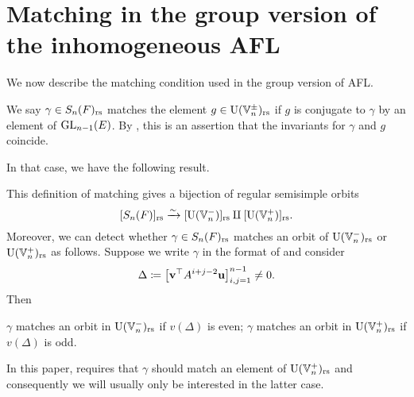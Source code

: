 \section{Matching in the group version of the inhomogeneous AFL}
We now describe the matching condition used in the group version of AFL.
\begin{definition}
  We say $\gamma \in S_n(F)_{\mathrm{rs}}$ matches the element $g \in \operatorname{U}(\mathbb V_n^\pm)_{\mathrm{rs}}$
  if $g$ is conjugate to $\gamma$ by an element of $\operatorname{GL}_{n-1}(E)$.
  By , this is an assertion that
  the invariants for $\gamma$ and $g$ coincide.
  \label{def:matching_inhomog}
\end{definition}
In that case, we have the following result.
\begin{proposition}
  \label{prop:valuation_delta_matching_group}
  This definition of matching gives
  a bijection of regular semisimple orbits
  \[ [S_n(F)]_{\mathrm{rs}} \xrightarrow{\sim} [\operatorname{U}(\mathbb V_n^-)]_{\mathrm{rs}} \amalg [\operatorname{U}(\mathbb V_n^+)]_{\mathrm{rs}}. \]
  Moreover, we can detect whether $\gamma \in S_n(F)_{\mathrm{rs}}$ matches an orbit of
  $\operatorname{U}(\mathbb V_n^-)_{\mathrm{rs}}$ or $\operatorname{U}(\mathbb V_n^+)_{\mathrm{rs}}$ as follows.
  Suppose we write $\gamma$ in the format of  and consider
  \[ \Delta \coloneqq \left[ \mathbf v^\top A^{i+j-2} \mathbf u \right]_{i,j=1}^{n-1} \neq 0. \]
  Then
  \begin{itemize}
    \ii $\gamma$ matches an orbit in $\operatorname{U}(\mathbb V_n^-)_{\mathrm{rs}}$ if $v(\Delta)$ is even;
    \ii $\gamma$ matches an orbit in $\operatorname{U}(\mathbb V_n^+)_{\mathrm{rs}}$ if $v(\Delta)$ is odd.
  \end{itemize}
\end{proposition}
In this paper, 
requires that $\gamma$ should match an element of $\operatorname{U}(\mathbb V_n^+)_{\mathrm{rs}}$
and consequently we will usually only be interested in the latter case.

